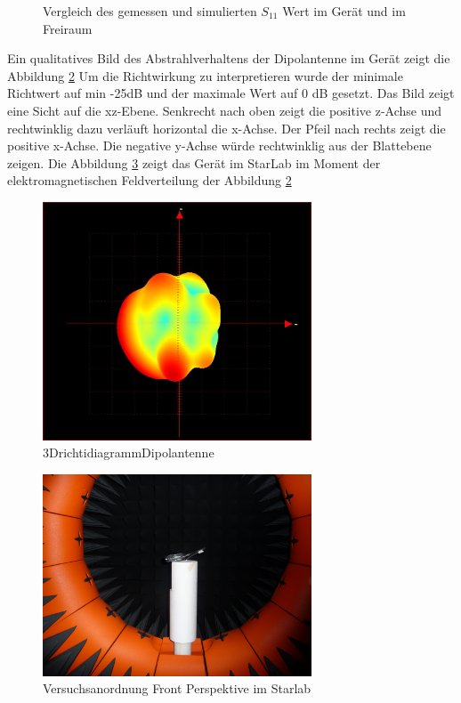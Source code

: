 \begin{figure}[!ht]
	\centering
	\begingroup
	
	\endgroup
	\caption{Vergleich des gemessen und simulierten $S_{11}$ Wert im Ger\"at und im Freiraum}	\label{S11_Messung_Simulation_Dipolantenn_Freiraum}
\end{figure}
\newpage
Ein qualitatives Bild des Abstrahlverhaltens der Dipolantenne im Gerät zeigt die Abbildung \ref{fig:3D Richtdiagramm} Um die Richtwirkung zu interpretieren wurde der minimale Richtwert auf min -25dB und der maximale Wert auf 0 dB gesetzt. Das Bild zeigt eine Sicht auf die xz-Ebene. Senkrecht nach oben zeigt die positive z-Achse und rechtwinklig dazu verläuft horizontal die x-Achse. Der Pfeil nach rechts zeigt die positive x-Achse. Die negative y-Achse würde rechtwinklig aus der Blattebene zeigen. Die Abbildung \ref{fig:FrontStarLab} zeigt das Gerät im StarLab im Moment der elektromagnetischen Feldverteilung der Abbildung \ref{fig:3D Richtdiagramm}\\
\begin{figure}[!h]
	\centering
	\includegraphics[width=8cm]{content/bilder/Implementierung/min25_0_x_yhinten_zoben.JPG}%
	\caption{3DrichtidiagrammDipolantenne}
	\label{fig:3D Richtdiagramm}
\end{figure}
\begin{figure}[!h]
	\centering
	\includegraphics[width=8cm]{content/bilder/Implementierung/Front.JPG}%
	\caption{Versuchsanordnung Front Perspektive im Starlab}
	\label{fig:FrontStarLab}
\end{figure}
